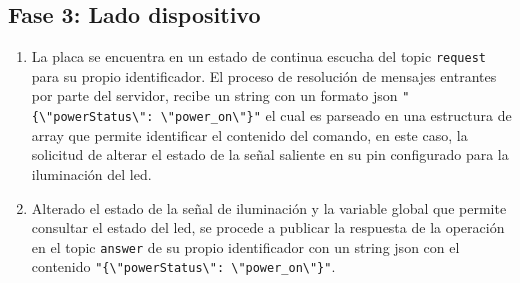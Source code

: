 \subsection{Fase 3: Lado dispositivo}
\label{ch:Capitulo5.3.3}
\begin{enumerate}
\item La placa se encuentra en un estado de continua escucha del topic \verb|request| para su propio identificador. El proceso de resolución de mensajes entrantes por parte del servidor, recibe un string con un formato \gls{json} \verb|"{\"powerStatus\": \"power_on\"}"| el cual es parseado en una estructura de array que permite identificar el contenido del comando, en este caso, la solicitud de alterar el estado de la señal saliente en su pin configurado para la iluminación del led. 

\item Alterado el estado de la señal de iluminación y la variable global que permite consultar el estado del led, se procede a publicar la respuesta de la operación en el topic \verb|answer| de su propio identificador con un string \gls{json} con el contenido \verb|"{\"powerStatus\": \"power_on\"}"|.
\end{enumerate}

